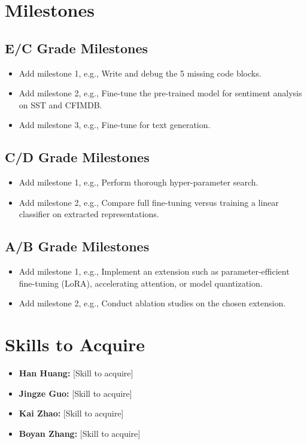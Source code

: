\documentclass{article}
\begin{document}
\section{Milestones}

\subsection{E/C Grade Milestones}
\begin{itemize}
    \item Add milestone 1, e.g., Write and debug the 5 missing code blocks.
    \item Add milestone 2, e.g., Fine-tune the pre-trained model for sentiment analysis on SST and CFIMDB.
    \item Add milestone 3, e.g., Fine-tune for text generation.
\end{itemize}

\subsection{C/D Grade Milestones}
\begin{itemize}
    \item Add milestone 1, e.g., Perform thorough hyper-parameter search.
    \item Add milestone 2, e.g., Compare full fine-tuning versus training a linear classifier on extracted representations.
\end{itemize}

\subsection{A/B Grade Milestones}
\begin{itemize}
    \item Add milestone 1, e.g., Implement an extension such as parameter-efficient fine-tuning (LoRA), accelerating attention, or model quantization.
    \item Add milestone 2, e.g., Conduct ablation studies on the chosen extension.
\end{itemize}

\section{Skills to Acquire}
\begin{itemize}
    \item \textbf{Han Huang:} [Skill to acquire]
    \item \textbf{Jingze Guo:} [Skill to acquire]
    \item \textbf{Kai Zhao:} [Skill to acquire]
    \item \textbf{Boyan Zhang:} [Skill to acquire]
\end{itemize}
\end{document}
